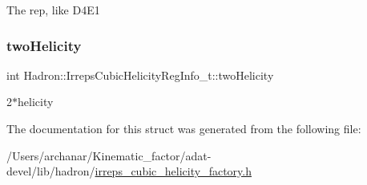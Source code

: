 The rep, like D4\+E1 \mbox{\label{structHadron_1_1IrrepsCubicHelicityRegInfo__t_a56f2014e4c57b36a5da63b9be44f1f0a}} 
\subsubsection{\texorpdfstring{twoHelicity}{twoHelicity}}
{\footnotesize\ttfamily int Hadron\+::\+Irreps\+Cubic\+Helicity\+Reg\+Info\+\_\+t\+::two\+Helicity}

2$\ast$helicity 

The documentation for this struct was generated from the following file\+:\begin{DoxyCompactItemize}
\item 
/\+Users/archanar/\+Kinematic\+\_\+factor/adat-\/devel/lib/hadron/\mbox{\hyperlink{adat-devel_2lib_2hadron_2irreps__cubic__helicity__factory_8h}{irreps\+\_\+cubic\+\_\+helicity\+\_\+factory.\+h}}\end{DoxyCompactItemize}

